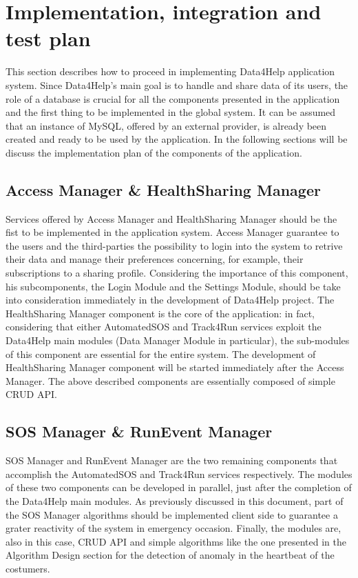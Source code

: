 \documentclass[DD.tex]{subfiles}
\begin{document}
\section{Implementation, integration and test plan}
This section describes how to proceed in implementing Data4Help application system.
Since Data4Help's main goal is to handle and share data of its users, the role of a database is crucial for all the components presented in the application and the first thing to be implemented in the global system. 
It can be assumed that an instance of MySQL, offered by an external provider, is already been created and ready to be used by the application. \newline
In the following sections will be discuss the implementation plan of the components of the application. 

\subsection{Access Manager \& HealthSharing Manager}
Services offered by Access Manager and HealthSharing Manager should be the fist to be implemented in the application system. \newline
Access Manager guarantee to the users and the third-parties the possibility to login into the system to retrive their data and manage their preferences concerning, for example, their subscriptions to a sharing profile. 
Considering the importance of this component, his subcomponents, the Login Module and the Settings Module, should be take into consideration immediately in the development of Data4Help project.
\newline
The HealthSharing Manager component is the core of the application: in fact, considering that either AutomatedSOS and Track4Run services exploit the Data4Help main modules (Data Manager Module in particular), the sub-modules of this component are essential for the entire system.  
The development of HealthSharing Manager component will be started immediately after the Access Manager. 
The above described components are essentially composed of simple CRUD API. 

\subsection{SOS Manager \& RunEvent Manager}
SOS Manager and RunEvent Manager are the two remaining components that accomplish the AutomatedSOS and Track4Run services respectively. \newline The modules of these two components can be developed in parallel, just after the completion of the Data4Help main modules. 
As previously discussed in this document, part of the SOS Manager algorithms should be implemented client side to guarantee a grater reactivity of the system in emergency occasion. \newline
Finally, the modules are, also in this case, CRUD API and simple algorithms like the one presented in the Algorithm Design section for the detection of anomaly in the heartbeat of the costumers. 

\newpage
\end{document}
